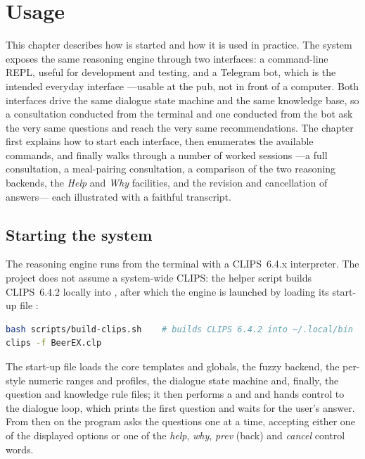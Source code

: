 \chapter{Usage}

This chapter describes how \cf{} is started and how it is used in practice. The
system exposes the same reasoning engine through two interfaces: a command-line
REPL, useful for development and testing, and a Telegram bot, which is
the intended everyday interface ---usable at the pub, not in front of a computer.
Both interfaces drive the same dialogue state machine and the same knowledge
base, so a consultation conducted from the terminal and one conducted from the
bot ask the very same questions and reach the very same recommendations. The
chapter first explains how to start each interface, then enumerates the available
commands, and finally walks through a number of worked sessions ---a full
consultation, a meal-pairing consultation, a comparison of the two reasoning
backends, the \emph{Help} and \emph{Why} facilities, and the revision and
cancellation of answers--- each illustrated with a faithful transcript.


\section{Starting the system}

The reasoning engine runs from the terminal with a CLIPS~6.4.x interpreter. The
project does not assume a system-wide CLIPS: the helper script
 builds CLIPS~6.4.2 locally into ,
after which the engine is launched by loading its start-up file
:

\begin{lstlisting}[language=bash,numbers=none]
bash scripts/build-clips.sh    # builds CLIPS 6.4.2 into ~/.local/bin
clips -f BeerEX.clp
\end{lstlisting}

The start-up file loads the core templates and globals, the fuzzy backend, the
per-style numeric ranges and profiles, the dialogue state machine and, finally,
the question and knowledge rule files; it then performs a  and
 and hands control to the dialogue loop, which prints the first
question and waits for the user's answer. From then on the program asks the
questions one at a time, accepting either one of the displayed options or one of
the \emph{help}, \emph{why}, \emph{prev} (back) and \emph{cancel} control words.

